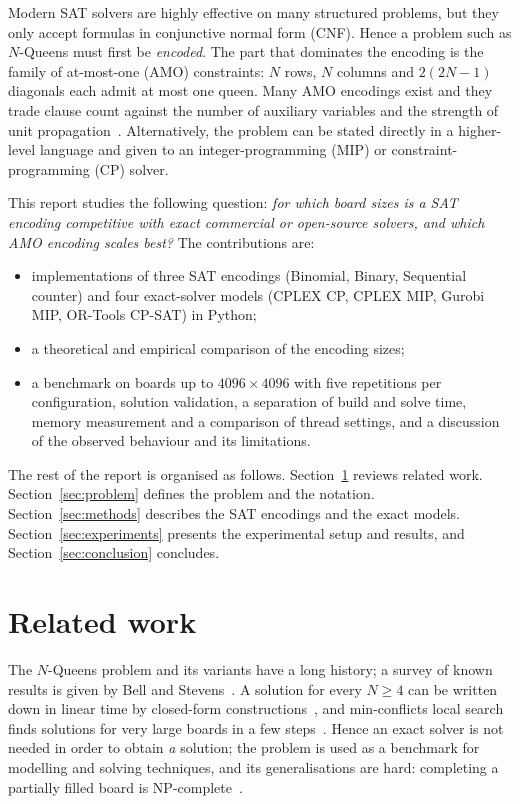 \documentclass[a4paper,fleqn]{cas-sc}
\begin{document}
Modern SAT solvers are highly effective on many structured problems, but they only accept formulas in conjunctive normal form (CNF).
Hence a problem such as $N$-Queens must first be \emph{encoded}.
The part that dominates the encoding is the family of at-most-one (AMO) constraints: $N$ rows, $N$ columns and $2(2N-1)$ diagonals each admit at most one queen.
Many AMO encodings exist and they trade clause count against the number of auxiliary variables and the strength of unit propagation~\cite{prestwich2009cnf}.
Alternatively, the problem can be stated directly in a higher-level language and given to an integer-programming (MIP) or constraint-programming (CP) solver.

This report studies the following question: \emph{for which board sizes is a SAT encoding competitive with exact commercial or open-source solvers, and which AMO encoding scales best?}
The contributions are:
\begin{itemize}
  \item implementations of three SAT encodings (Binomial, Binary, Sequential counter) and four exact-solver models (CPLEX CP, CPLEX MIP, Gurobi MIP, OR-Tools CP-SAT) in Python;
  \item a theoretical and empirical comparison of the encoding sizes;
  \item a benchmark on boards up to $4096\times4096$ with five repetitions per configuration, solution validation, a separation of build and solve time, memory measurement and a comparison of thread settings, and a discussion of the observed behaviour and its limitations.
\end{itemize}
The rest of the report is organised as follows. Section~\ref{sec:related} reviews related work. Section~\ref{sec:problem} defines the problem and the notation.
Section~\ref{sec:methods} describes the SAT encodings and the exact models.
Section~\ref{sec:experiments} presents the experimental setup and results, and Section~\ref{sec:conclusion} concludes.

\FloatBarrier
\section{Related work}\label{sec:related}
The $N$-Queens problem and its variants have a long history; a survey of known results is given by Bell and Stevens~\cite{bell2009survey}.
A solution for every $N\ge4$ can be written down in linear time by closed-form constructions~\cite{hoffman1969constructions,abramson1989divide}, and min-conflicts local search finds solutions for very large boards in a few steps~\cite{minton1992minimizing,sosic1994efficient}.
Hence an exact solver is not needed in order to obtain \emph{a} solution; the problem is used as a benchmark for modelling and solving techniques, and its generalisations are hard: completing a partially filled board is NP-complete~\cite{gent2017complexity}.
\end{document}
